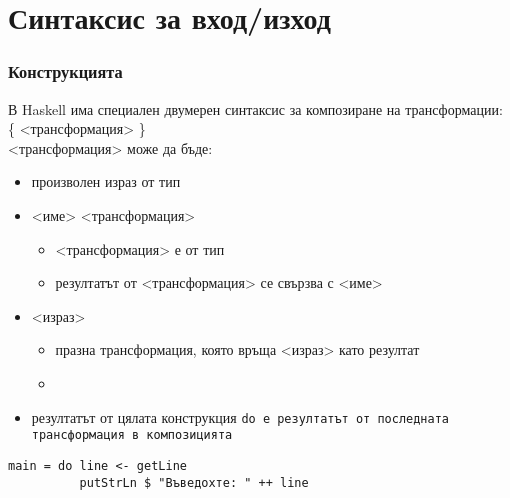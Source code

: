 \documentclass[alsotrans]{beamerswitch}
\begin{document}
\section{Синтаксис за вход/изход}

\begin{frame}[fragile]
  \frametitle{Конструкцията }

  В Haskell има специален \alert{двумерен} синтаксис за композиране на трансформации:\\[1ex]
   \{ <трансформация> \}\\[1ex]
  \pause
  <трансформация> може да бъде:
  \begin{itemize}[<+->]
  \item произволен израз от тип 
  \item{} <име> \tta{<-} <трансформация>
    \begin{itemize}
    \item{} <трансформация> е от тип 
    \item резултатът от <трансформация> се свързва с <име>
    \end{itemize}
  \item {} <израз>
    \begin{itemize}
    \item празна трансформация, която връща <израз> като резултат
    \item {}
    \end{itemize}
  \item резултатът от цялата конструкция \tt{do} е резултатът от последната трансформация в композицията
  \end{itemize}
  \onslide<+->
  \vspace{-.5ex}
\begin{lstlisting}
main = do line <- getLine
          putStrLn $ "Въведохте: " ++ line
\end{lstlisting}
\end{frame}
\end{document}
